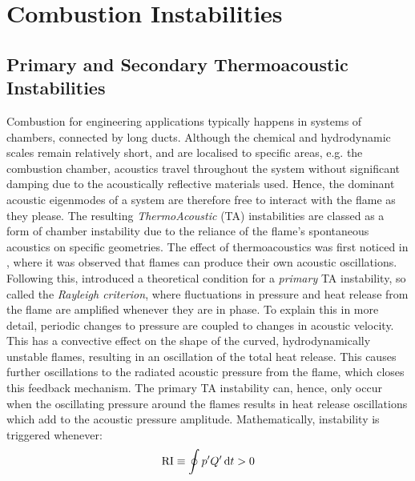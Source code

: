 \section{Combustion Instabilities}

\subsection{Primary and Secondary Thermoacoustic Instabilities}

Combustion for engineering applications typically happens in systems of chambers, connected by long ducts. Although the chemical and hydrodynamic scales remain relatively short, and are localised to specific areas, e.g. the combustion chamber, acoustics travel throughout the system without significant damping due to the acoustically reflective materials used. Hence, the dominant acoustic eigenmodes of a system are therefore free to interact with the flame as they please. The resulting \emph{ThermoAcoustic} (TA) instabilities are classed as a form of chamber instability due to the reliance of the flame's spontaneous acoustics on specific geometries. The effect of thermoacoustics was first noticed in \cite{mallard1883RecherchesExperimentalesTheoriques}, where it was observed that flames can produce their own acoustic oscillations. Following this, \cite{rayleigh1896TheorySound} introduced a theoretical condition for a \emph{primary} TA instability, so called the \emph{Rayleigh criterion}, where fluctuations in pressure and heat release from the flame are amplified whenever they are in phase. To explain this in more detail, periodic changes to pressure are coupled to changes in acoustic velocity. This has a convective effect on the shape of the curved, hydrodynamically unstable \cite{darrieus1945PropagationDunFront,landau1944TheorySlowCombustion,matalon2018DarrieusLandauInstability} flames, resulting in an oscillation of the total heat release. This causes further oscillations to the radiated acoustic pressure from the flame, which closes this feedback mechanism. The primary TA instability can, hence, only occur when the oscillating pressure around the flames results in heat release oscillations which add to the acoustic pressure amplitude. Mathematically, instability is triggered whenever:
\begin{equation}
\mathrm{RI} \equiv \oint p' Q' \dd{t} > 0
\end{equation}
